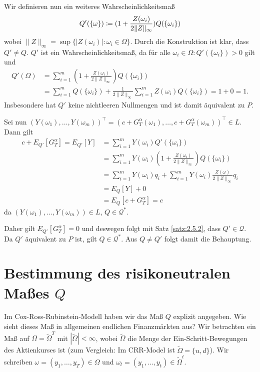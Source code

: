 \documentclass[a4paper,twoside,DIV15,BCOR12mm]{scrbook}
\newcommand{\cQ}{\mathcal Q}
\begin{document}
\begin{beweis}
Wir definieren nun ein weiteres Wahrscheinlichkeitsmaß 
\[
Q'(\{\omega\}) \da (1 + \frac{Z(\omega_i)}{2 \|Z\|_\infty}) Q(\{\omega_i\})
\]
wobei $\|Z\|_\infty = \sup \{|Z(\omega_i)|: \omega_i\in \Omega\}$. Durch die Konstruktion ist klar, dass $Q'\ne Q$. $Q'$ ist ein Wahrscheinlichkeitsmaß, da für alle $\omega_i\in \Omega: Q'(\{\omega_i\}) > 0$ gilt und
\begin{align*}
Q'(\Omega) &= \sum_{i=1}^m (1 + \frac{Z(\omega_i)}{2\|Z\|_\infty})Q(\{\omega_i\}) \\
&= \sum_{i=1}^m Q(\{\omega_i\}) + \frac{1}{2\|Z\|_\infty} \sum_{i=1}^m Z(\omega_i)Q(\{\omega_i\}) = 1 + 0 = 1.
\end{align*}
Insbesondere hat $Q'$ keine nichtleeren Nullmengen und ist damit äquivalent zu $P$.


Sei nun $(Y(\omega_1),\ldots,Y(\omega_m))^\top = (c + G_T^\alpha(\omega_1),\ldots,c + G_T^\alpha(\omega_m))^\top \in L$. Dann gilt
\begin{align*}
c + E_{Q'} [G_T^\alpha]  = E_{Q'}[Y]
&= \sum_{i=1}^m Y(\omega_i)Q'(\{\omega_i\})\\
&= \sum_{i=1}^m Y(\omega_i) (1 + \frac{Z(\omega_i)}{2\|Z\|_\infty})Q(\{\omega_i\}) \\
&= \sum_{i=1}^m Y(\omega_i)q_i + \sum_{i=1}^m Y(\omega_i) \frac{Z(\omega)}{2\|Z\|_\infty} q_i \\
&= E_Q[Y] + 0 \\
&= E_Q[c + G_T^\alpha] = c
\end{align*}
da $(Y(\omega_1),\ldots,Y(\omega_m))\in L$, $Q\in \cQ^*$.

Daher gilt $E_{Q'}[G_T^\alpha] = 0$ und deswegen folgt mit Satz \ref{satz:2.5.2}, dass $Q'\in \cQ$. Da $Q'$ äquivalent zu $P$ ist, gilt $Q\in \cQ^*$. Aus $Q\ne Q'$ folgt damit die Behauptung.
\end{beweis}

\section{Bestimmung des risikoneutralen Maßes $Q$}

Im Cox-Ross-Rubinstein-Modell haben wir das Maß $Q$ explizit angegeben. Wie sieht dieses Maß in allgemeinen endlichen Finanzmärkten aus? Wir betrachten ein Maß auf $\Omega = \tilde\Omega^T$ mit $|\tilde\Omega|<\infty$, wobei $\tilde\Omega$ die Menge der Ein-Schritt-Bewegungen des Aktienkurses ist (zum Vergleich: Im CRR-Model ist $\tilde\Omega=\{u,d\}$). Wir schreiben $\omega=(y_1,\ldots,y_T)\in \Omega$ und $\omega_t = (y_1,\ldots,y_t)\in \tilde\Omega^t$.
\end{document}
